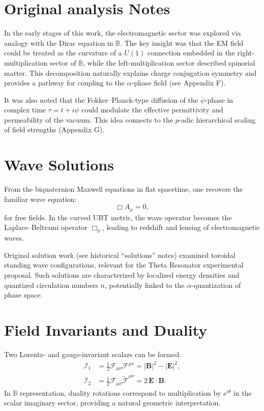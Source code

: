 \section{Original analysis Notes}
In the early stages of this work, the electromagnetic sector was explored via analogy with the Dirac equation in $\mathbb{B}$. The key insight was that the EM field could be treated as the curvature of a $U(1)$ connection embedded in the right-multiplication sector of $\mathbb{B}$, while the left-multiplication sector described spinorial matter. This decomposition naturally explains charge conjugation symmetry and provides a pathway for coupling to the $\alpha$-phase field (see Appendix F).

It was also noted that the Fokker--Planck-type diffusion of the $\psi$-phase in complex time $\tau = t + i\psi$ could modulate the effective permittivity and permeability of the vacuum. This idea connects to the $p$-adic hierarchical scaling of field strengths (Appendix G).

\section{Wave Solutions}
From the biquaternion Maxwell equations in flat spacetime, one recovers the familiar wave equation:
\begin{equation}
    \Box A_\mu = 0,
\end{equation}
for free fields. In the curved UBT metric, the wave operator becomes the Laplace--Beltrami operator $\Box_g$, leading to redshift and lensing of electromagnetic waves.

Original solution work (see historical ``solutions'' notes) examined toroidal standing wave configurations, relevant for the Theta Resonator experimental proposal. Such solutions are characterized by localized energy densities and quantized circulation numbers $n$, potentially linked to the $\alpha$-quantization of phase space.

\section{Field Invariants and Duality}
Two Lorentz- and gauge-invariant scalars can be formed:
\begin{align}
    \mathcal{I}_1 &= \frac{1}{2} \mathcal{F}_{\mu\nu} \mathcal{F}^{\mu\nu} 
        = |\mathbf{B}|^2 - |\mathbf{E}|^2, \\
    \mathcal{I}_2 &= \frac{1}{2} \mathcal{F}_{\mu\nu} \tilde{\mathcal{F}}^{\mu\nu} 
        = 2\,\mathbf{E} \cdot \mathbf{B}.
\end{align}
In $\mathbb{B}$ representation, duality rotations correspond to multiplication by $e^{i\theta}$ in the scalar imaginary sector, providing a natural geometric interpretation.

